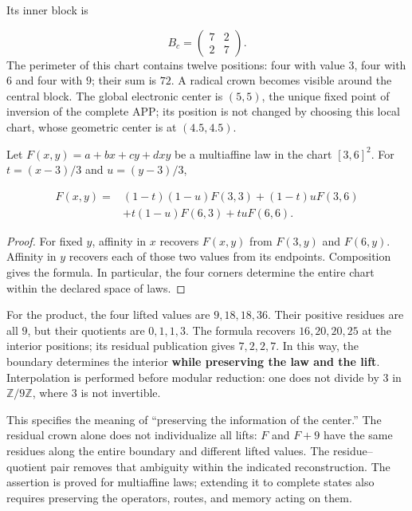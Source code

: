 

Its inner block is

\[
B_c=\begin{pmatrix}7&2\\2&7\end{pmatrix}.
\]
The perimeter of this chart contains twelve positions: four with value \(3\), four with \(6\) and four with \(9\); their sum is \(72\). A radical crown becomes visible around the central block. The global electronic center is \((5,5)\), the unique fixed point of inversion of the complete APP; its position is not changed by choosing this local chart, whose geometric center is at \((4.5,4.5)\).

\begin{proposition}
\label{viii:prop:centro-frontera-recuperacion}
Let \(F(x,y)=a+bx+cy+dxy\) be a multiaffine law in the chart \([3,6]^2\). For \(t=(x-3)/3\) and \(u=(y-3)/3\),

\[
\begin{aligned}
F(x,y)={}&(1-t)(1-u)F(3,3)+(1-t)uF(3,6)\\
&+t(1-u)F(6,3)+tuF(6,6).
\end{aligned}
\]
\end{proposition}
\begin{proof}
For fixed \(y\), affinity in \(x\) recovers \(F(x,y)\) from \(F(3,y)\) and \(F(6,y)\). Affinity in \(y\) recovers each of those two values from its endpoints. Composition gives the formula. In particular, the four corners determine the entire chart within the declared space of laws.
\end{proof}

For the product, the four lifted values are \(9,18,18,36\). Their positive residues are all \(9\), but their quotients are \(0,1,1,3\). The formula recovers \(16,20,20,25\) at the interior positions; its residual publication gives \(7,2,2,7\). In this way, the boundary determines the interior \textbf{while preserving the law and the lift}. Interpolation is performed before modular reduction: one does not divide by \(3\) in \(\mathbb Z/9\mathbb Z\), where \(3\) is not invertible.

This specifies the meaning of “preserving the information of the center.” The residual crown alone does not individualize all lifts: \(F\) and \(F+9\) have the same residues along the entire boundary and different lifted values. The residue–quotient pair removes that ambiguity within the indicated reconstruction. The assertion is proved for multiaffine laws; extending it to complete states also requires preserving the operators, routes, and memory acting on them.

